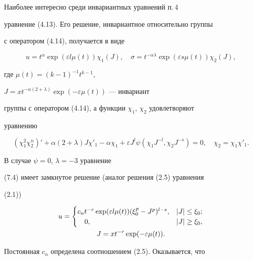 Наиболее интересно среди инвариантных уравнений п.\,4


уравнение (4.13). Его решение, инвариантное относительно группы


с оператором (4.14), получается в виде


\begin{equation}


u=t^\alpha\exp(\varepsilon l\mu(t))\chi_1(J),\quad


\sigma=t^{-\alpha\lambda}\exp(\varepsilon s\mu(t))\chi_2(J),


\end{equation}


где $\mu(t)=(k-1)^{-1}t^{k-1}$,


$J=xt^{-\alpha(2+\lambda)}\exp(-\varepsilon\mu(t))$ --- инвариант


группы с оператором (4.14), а функции $\chi_1$, $\chi_2$ удовлетворяют


уравнению


\begin{equation}


(\chi^2_1\chi^n_2)'+\alpha(2+\lambda)J\chi'_1-\alpha\chi_1


+\varepsilon J^l\psi(\chi_1J^{-l},\chi_2J^{-s})=0,\quad


\chi_2=\chi_1\chi'_1.


\end{equation}


В случае $\psi=0$, $\lambda=-3$  уравнение


(7.4)  имеет  замкнутое решение (аналог решения (2.5) уравнения


(2.1))


\begin{gather}


u=


\begin{cases}


c_n t^{-r}\exp(\varepsilon l\mu(t))(\xi^p_0-J^p)^{l-s}, &


|J|\le \xi_0;\\


\quad 0,& |J|\ge \xi_0,


\end{cases}


\\


J=xt^{-r}\exp(-\varepsilon\mu(t)).\notag


\end{gather}


Постоянная $c_n$  определена соотношением (2.5). Оказывается, что


